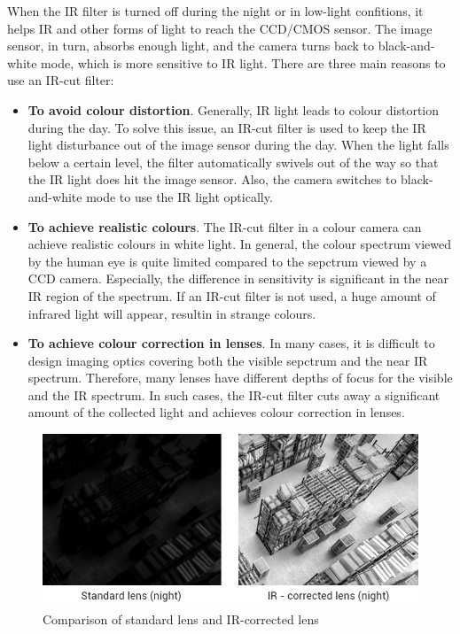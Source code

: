 \documentclass[10pt]{article}
\begin{document}
\begin{multicols}{2}
When the IR filter is turned off during the night or in low-light confitions, it helps IR and other forms of light to reach the CCD/CMOS sensor. The image sensor, in turn, absorbs enough light, and the camera turns back to black-and-white mode, which is more sensitive to IR light.
\newline \newline
There are three main reasons to use an IR-cut filter:
\begin{itemize}
    \item \textbf{To avoid colour distortion}. Generally, IR light leads to colour distortion during the day. To solve this issue, an IR-cut filter is used to keep the IR light disturbance out of the image sensor during the day. When the light falls below a certain level, the filter automatically swivels out of the way so that the IR light does hit the image sensor. Also, the camera switches to black-and-white mode to use the IR light optically.
    \item \textbf{To achieve realistic colours}. The IR-cut filter in a colour camera can achieve realistic colours in white light. In general, the colour spectrum viewed by the human eye is quite limited compared to the sepctrum viewed by a CCD camera. Especially, the difference in sensitivity is significant in the near IR region of the spectrum. If an IR-cut filter is not used, a huge amount of infrared light will appear, resultin in strange colours.
    \item \textbf{To achieve colour correction in lenses}. In many cases, it is difficult to design imaging optics covering both the visible sepctrum and the near IR spectrum. Therefore, many lenses have different depths of focus for the visible and the IR spectrum. In such cases, the IR-cut filter cuts away a significant amount of the collected light and achieves colour correction in lenses.
\end{itemize}
\begin{figure}[H]
    \centering
    \includegraphics[width=0.8\linewidth]{Images/Week 1/IR-day-night.jpg}
    \caption{Comparison of standard lens and IR-corrected lens}
    \label{fig:IR-day-night}
\end{figure}

\end{multicols}
\end{document}
